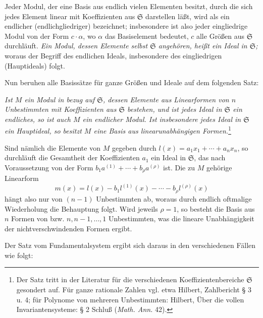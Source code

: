 \documentclass[11pt]{article}
\providecommand{\frS}{\mathfrak S}
\begin{document}
Jeder Modul, der eine Basis aus endlich vielen Elementen besitzt, durch die sich jedes Element linear mit Koeffizienten aus \(\frS\) darstellen läßt, wird als ein endlicher (endlichgliedriger) bezeichnet; insbesondere ist also jeder eingliedrige Modul von der Form \(c\cdot\alpha\), wo \(\alpha\) das Basiselement bedeutet, \(c\) alle Größen aus \(\frS\) durchläuft. \emph{Ein Modul, dessen Elemente selbst \(\frS\) angehören, heißt ein Ideal in \(\frS\);} woraus der Begriff des endlichen Ideals, insbesondere des eingliedrigen (Hauptideals) folgt.

Nun beruhen alle Basissätze für ganze Größen und Ideale auf dem folgenden Satz:

\emph{Ist \(M\) ein Modul in bezug auf \(\frS\), dessen Elemente aus Linearformen von \(n\) Unbestimmten mit Koeffizienten aus \(\frS\) bestehen, und ist jedes Ideal in \(\frS\) ein endliches, so ist auch \(M\) ein endlicher Modul. Ist insbesondere jedes Ideal in \(\frS\) ein Hauptideal, so besitzt \(M\) eine Basis aus linearunabhängigen Formen.}\footnote{Der Satz tritt in der Literatur für die verschiedenen Koeffizientenbereiche \(\frS\) gesondert auf. Für ganze rationale Zahlen vgl. etwa Hilbert, Zahlbericht § 3 u. 4; für Polynome von mehreren Unbestimmten: Hilbert, Über die vollen Invariantensysteme: § 2 Schluß (\emph{Math. Ann.} 42).}

Sind nämlich die Elemente von \(M\) gegeben durch \(l(x)=a_1x_1+\cdots+a_nx_n\), so durchläuft die Gesamtheit der Koeffizienten \(a_1\) ein Ideal in \(\frS\), das nach Voraussetzung von der Form \(b_1a^{(1)}+\cdots+b_\rho a^{(\rho)}\) ist. Die zu \(M\) gehörige Linearform
\[
m(x)=l(x)-b_1l^{(1)}(x)-\cdots-b_\rho l^{(\rho)}(x)
\]
hängt also nur von \((n-1)\) Unbestimmten ab, woraus durch endlich oftmalige Wiederholung die Behauptung folgt. Wird jeweils \(\rho=1\), so besteht die Basis aus \(n\) Formen von bzw. \(n,n-1,\ldots,1\) Unbestimmten, was die lineare Unabhängigkeit der nichtverschwindenden Formen ergibt.

Der Satz vom Fundamentalsystem ergibt sich daraus in den verschiedenen Fällen wie folgt:
\end{document}
